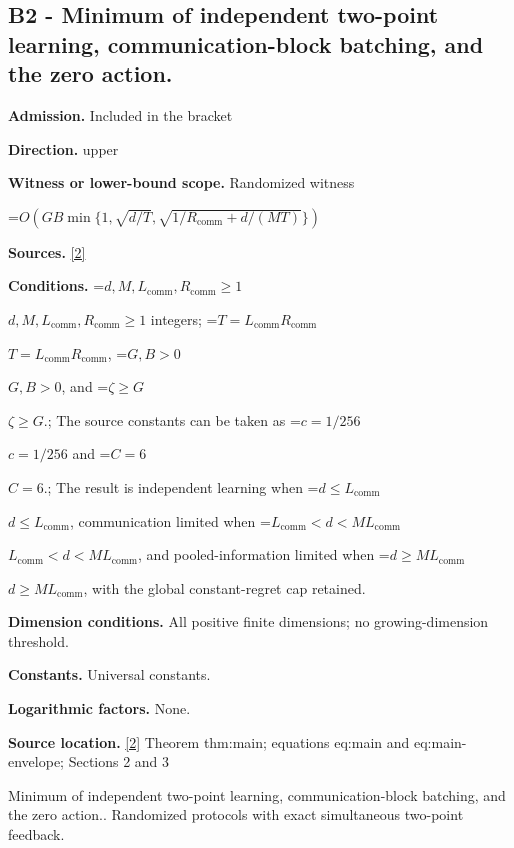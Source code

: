 \documentclass[10pt,a4paper]{article}
\newcommand{\AtlasMath}[1]{\par\begingroup\centering\setbox0=\hbox{$\displaystyle #1$}\ifdim\wd0>1.4\linewidth\typeout{ATLAS WIDE FORMULA: \the\wd0}\fi\ifdim\wd0>\linewidth\resizebox{\linewidth}{!}{\box0}\else\box0\fi\par\endgroup}
\newcommand{\AtlasInlineMath}[1]{\begingroup\setbox0=\hbox{$#1$}\ifdim\wd0>.4\linewidth\endgroup\AtlasMath{#1}\else\endgroup$#1$\fi}
\begin{document}
\subsection{B2 - Minimum of independent two-point learning, communication-block batching, and the zero action.}


\textbf{Admission.} Included in the bracket



\textbf{Direction.} upper



\textbf{Witness or lower-bound scope.} Randomized witness



\AtlasMath{O\!\left(GB\min\{1,\sqrt{d/T},\sqrt{1/R_{\mathrm{comm}}+d/(MT)}\}\right)}


\textbf{Sources.} \href{https://github.com/WU-Wendao/Colombo/blob/main/colombo_sensorium/Complexity_altas/data/sources/colombo/A7/manuscript.pdf}{[2]}



\textbf{Conditions.} \AtlasInlineMath{d,M,L_{\mathrm{comm}},R_{\mathrm{comm}}\ge1} integers; \AtlasInlineMath{T=L_{\mathrm{comm}}R_{\mathrm{comm}}}, \AtlasInlineMath{G,B>0}, and \AtlasInlineMath{\zeta\ge G}.; The source constants can be taken as \AtlasInlineMath{c=1/256} and \AtlasInlineMath{C=6}.; The result is independent learning when \AtlasInlineMath{d\le L_{\mathrm{comm}}}, communication limited when \AtlasInlineMath{L_{\mathrm{comm}}<d<ML_{\mathrm{comm}}}, and pooled-information limited when \AtlasInlineMath{d\ge ML_{\mathrm{comm}}}, with the global constant-regret cap retained.



\textbf{Dimension conditions.} All positive finite dimensions; no growing-dimension threshold.



\textbf{Constants.} Universal constants.



\textbf{Logarithmic factors.} None.



\textbf{Source location.} \href{https://github.com/WU-Wendao/Colombo/blob/main/colombo_sensorium/Complexity_altas/data/sources/colombo/A7/manuscript.pdf}{[2]} Theorem thm:main; equations eq:main and eq:main-envelope; Sections 2 and 3



Minimum of independent two-point learning, communication-block batching, and the zero action.. Randomized protocols with exact simultaneous two-point feedback.
\end{document}
